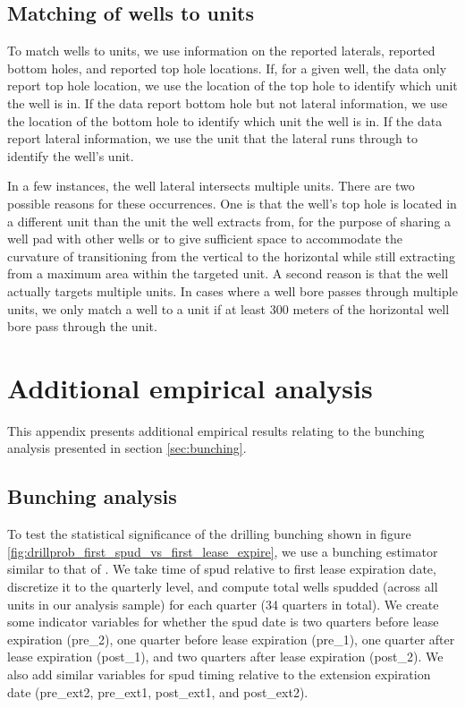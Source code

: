\documentclass[12pt]{article}
\begin{document}
\subsection{Matching of wells to units} \label{appx:wellunitmatch}

To match wells to units, we use information on the reported laterals, reported bottom holes, and reported top hole locations. If, for a given well, the data only report top hole location, we use the location of the top hole to identify which unit the well is in. If the data report bottom hole but not lateral information, we use the location of the bottom hole to identify which unit the well is in. If the data report lateral information, we use the unit that the lateral runs through to identify the well's unit.

In a few instances, the well lateral intersects multiple units. There are two possible reasons for these occurrences. One is that the well's top hole is located in a different unit than the unit the well extracts from, for the purpose of sharing a well pad with other wells or to give sufficient space to accommodate the curvature of transitioning from the vertical to the horizontal while still extracting from a maximum area within the targeted unit. A second reason is that the well actually targets multiple units. In cases where a well bore passes through multiple units, we only match a well to a unit if at least 300 meters of the horizontal well bore pass through the unit.

\section{Additional empirical analysis} \label{appx:more_data_analysis}

This appendix presents additional empirical results relating to the bunching analysis presented in section \ref{sec:bunching}.



\subsection{Bunching analysis} \label{appx:bunching}

To test the statistical significance of the drilling bunching shown in figure \ref{fig:drillprob_first_spud_vs_first_lease_expire}, we use a bunching estimator similar to that of \citet{bib:chetty}. We take time of spud relative to first lease expiration date, discretize it to the quarterly level, and compute total wells spudded (across all units in our analysis sample) for each quarter (34 quarters in total). We create some indicator variables for whether the spud date is two quarters before lease expiration (pre\_2), one quarter before lease expiration (pre\_1), one quarter after lease expiration (post\_1), and two quarters after lease expiration (post\_2). We also add similar variables for spud timing relative to the extension expiration date (pre\_ext2, pre\_ext1, post\_ext1, and post\_ext2).
\end{document}
